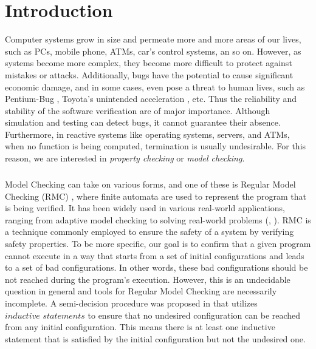 
\chapter{Introduction}\label{chapter:introduction}
Computer systems grow in size and permeate more and more areas of our lives, such as PCs, mobile phone,
ATMs, car's control systems, an so on.
However, as systems become more complex, they become more difficult to protect against mistakes or attacks.
Additionally, bugs have the potential to cause significant economic damage, and in some cases, even pose a threat to human lives, such as Pentium-Bug \cite*{KniesPentiumBug}, Toyota's unintended acceleration \cite*{koopman2014case}, etc.
Thus the reliability and stability of the software verification are of major importance. 
Although simulation and testing can detect bugs, it cannot guarantee their absence.
Furthermore, in reactive systems like operating systems, servers, and ATMs, when no function is being computed, termination is usually undesirable. 
For this reason, we are interested in \textit{property checking} or \textit{model checking}. 

\paragraph*{}
Model Checking can take on various forms, and one of these is Regular Model Checking (RMC) \cite*{bouajjani2000regular},
where finite automata are used to represent the program that is being verified.
It has been widely used in various real-world applications, ranging from adaptive 
model checking to solving real-world problems (\cite{faster}, \cite{survey}).
RMC is a technique commonly employed to ensure the safety of a system by verifying safety properties.
To be more specific, our goal is to confirm that a given program cannot execute 
in a way that starts from a set of initial configurations and leads to a set 
of bad configurations. 
In other words, these bad configurations should be not reached during the program's execution. 
However, this is an undecidable question in general and tools for Regular Model Checking 
are necessarily incomplete.
A semi-decision procedure was proposed in \cite*{Welzel2023InductiveSts} that utilizes 
$\textit{inductive statements}$ to ensure that no undesired configuration can be reached 
from any initial configuration. 
This means there is at least one inductive statement that is satisfied by the initial configuration but not the undesired one.

